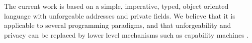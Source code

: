

 
  The current work is based on a simple, imperative, typed, object oriented
language with unforgeable addresses and private fields. We believe
 that %
 it is applicable to several programming paradigms, and 
 that   unforgeability and privacy
 can be replaced 
 by lower level mechanisms such as capability machines \cite{vanproving,davis2019cheriabi}.
 


% 
% 
%
% 
% 

